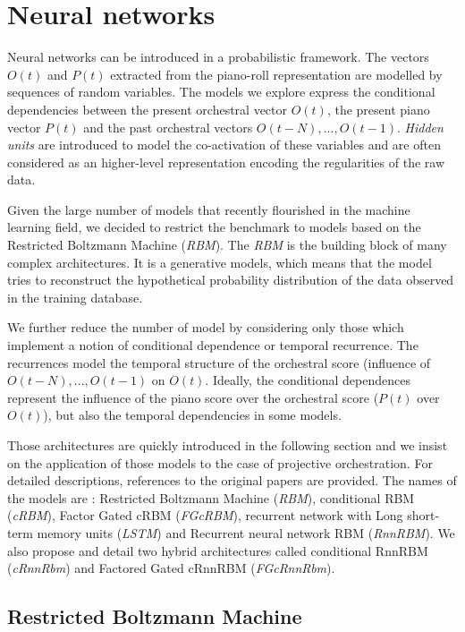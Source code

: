 \documentclass{article}
\begin{document}
\section{Neural networks}
Neural networks can be introduced in a probabilistic framework. The vectors $O(t)$ and $P(t)$ extracted from the piano-roll representation are modelled by sequences of random variables.
The models we explore express the conditional dependencies between the present orchestral vector $O(t)$, the present piano vector $P(t)$ and the past orchestral vectors $O(t-N),...,O(t-1)$. \textit{Hidden units} are introduced to model the co-activation of these variables and are often considered as an higher-level representation encoding the regularities of the raw data.

Given the large number of models that recently flourished in the machine learning field, we decided to restrict the benchmark to models based on the Restricted Boltzmann Machine (\textit{RBM}).
The \textit{RBM} is the building block of many complex architectures. It is a generative models, which means that the model tries to reconstruct the hypothetical probability distribution of the data observed in the training database.

We further reduce the number of model by considering only those which implement a notion of conditional dependence or temporal recurrence. The recurrences model the temporal structure of the orchestral score (influence of $O(t-N),...,O(t-1)$ on $O(t)$. Ideally, the conditional dependences represent the influence of the piano score over the orchestral score ($P(t)$ over $O(t)$), but also the temporal dependencies in some models.

Those architectures are quickly introduced in the following section and we insist on the application of those models to the case of projective orchestration. For detailed descriptions, references to the original papers are provided. The names of the models are : Restricted Boltzmann Machine (\textit{RBM}), conditional RBM (\textit{cRBM}), Factor Gated cRBM (\textit{FGcRBM}), recurrent network with Long short-term memory units (\textit{LSTM}) and Recurrent neural network RBM (\textit{RnnRBM}).
We also propose and detail two hybrid architectures called conditional RnnRBM (\textit{cRnnRbm}) and Factored Gated cRnnRBM (\textit{FGcRnnRbm}).

\subsection{Restricted Boltzmann Machine}
\end{document}
